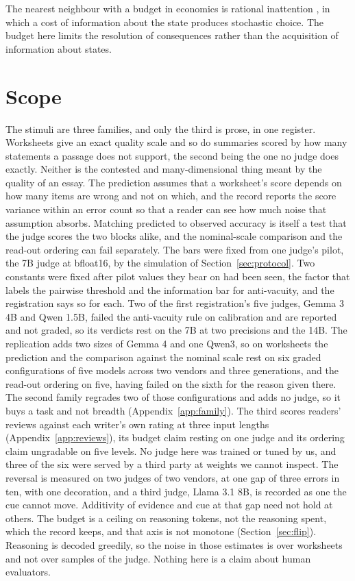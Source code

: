 \documentclass{article}
\theoremstyle{definition}
\theoremstyle{remark}
\begin{document}
The nearest neighbour with a budget in economics is rational inattention \citep{sims2003,caplin2015,matejka2015}, in which a cost of information about the state produces stochastic choice.
The budget here limits the resolution of consequences rather than the acquisition of information about states.

\section{Scope}
\label{sec:scope}

The stimuli are three families, and only the third is prose, in one register.
Worksheets give an exact quality scale and so do summaries scored by how many statements a passage does not support, the second being the one no judge does exactly.
Neither is the contested and many-dimensional thing meant by the quality of an essay.
The prediction assumes that a worksheet's score depends on how many items are wrong and not on which, and the record reports the score variance within an error count so that a reader can see how much noise that assumption absorbs.
Matching predicted to observed accuracy is itself a test that the judge scores the two blocks alike, and the nominal-scale comparison and the read-out ordering can fail separately.
The bars were fixed from one judge's pilot, the 7B judge at bfloat16, by the simulation of Section~\ref{sec:protocol}.
Two constants were fixed after pilot values they bear on had been seen, the factor that labels the pairwise threshold and the information bar for anti-vacuity, and the registration says so for each.
Two of the first registration's five judges, Gemma 3 4B and Qwen 1.5B, failed the anti-vacuity rule on calibration and are reported and not graded, so its verdicts rest on the 7B at two precisions and the 14B.
The replication adds two sizes of Gemma 4 and one Qwen3, so on worksheets the prediction and the comparison against the nominal scale rest on six graded configurations of five models across two vendors and three generations, and the read-out ordering on five, having failed on the sixth for the reason given there.
The second family regrades two of those configurations and adds no judge, so it buys a task and not breadth (Appendix~\ref{app:family}). The third scores readers' reviews against each writer's own rating at three input lengths (Appendix~\ref{app:reviews}), its budget claim resting on one judge and its ordering claim ungradable on five levels.
No judge here was trained or tuned by us, and three of the six were served by a third party at weights we cannot inspect.
The reversal is measured on two judges of two vendors, at one gap of three errors in ten, with one decoration, and a third judge, Llama 3.1 8B, is recorded as one the cue cannot move.
Additivity of evidence and cue at that gap need not hold at others.
The budget is a ceiling on reasoning tokens, not the reasoning spent, which the record keeps, and that axis is not monotone (Section~\ref{sec:flip}).
Reasoning is decoded greedily, so the noise in those estimates is over worksheets and not over samples of the judge.
Nothing here is a claim about human evaluators.
\end{document}
